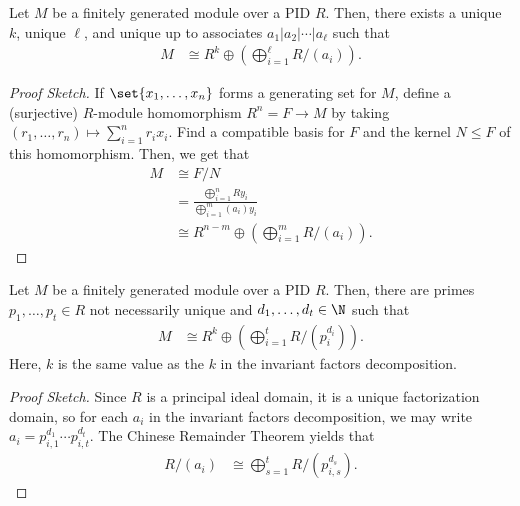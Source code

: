 \documentclass[10pt]{mypackage}
\begin{document}
\begin{theorem}
  Let $M$ be a finitely generated module over a PID $R$. Then, there exists a unique $k$, unique $\ell$, and unique up to associates $a_1 | a_2 | \cdots | a_{\ell}$ such that
  \begin{align*}
    M &\cong R^{k}\oplus \left( \bigoplus_{i=1}^{\ell} R/\left( a_i \right) \right).
  \end{align*}
\end{theorem}
\begin{proof}[Proof Sketch]
  If $\set{x_1,\dots,x_n}$ forms a generating set for $M$, define a (surjective) $R$-module homomorphism $R^{n} = F\rightarrow M$ by taking $\left( r_1,\dots,r_n \right)\mapsto \sum_{i=1}^{n}r_ix_i$. Find a compatible basis for $F$ and the kernel $N\leq F$ of this homomorphism. Then, we get that
  \begin{align*}
    M &\cong F/N\\
      &= \frac{\bigoplus_{i=1}^{n}Ry_i}{\bigoplus_{i=1}^{m}\left( a_i \right)y_i}\\
      &\cong R^{n-m} \oplus \left( \bigoplus_{i=1}^{m}R/\left( a_i \right) \right).
  \end{align*}
\end{proof}
\begin{theorem}
  Let $M$ be a finitely generated module over a PID $R$. Then, there are primes $p_1,\dots,p_t\in R$ not necessarily unique and $d_1,\dots,d_t\in \N$ such that
  \begin{align*}
    M &\cong R^{k}\oplus \left( \bigoplus_{i=1}^{t}R/\left( p_i^{d_i} \right) \right).
  \end{align*}
  Here, $k$ is the same value as the $k$ in the invariant factors decomposition.
\end{theorem}
\begin{proof}[Proof Sketch]
  Since $R$ is a principal ideal domain, it is a unique factorization domain, so for each $a_i$ in the invariant factors decomposition, we may write $a_i = p_{i,1}^{d_1}\cdots p_{i,t}^{d_t}$. The Chinese Remainder Theorem yields that
  \begin{align*}
    R/\left( a_i \right) &\cong \bigoplus_{s=1}^{t} R/\left( p_{i,s}^{d_{s}} \right).
  \end{align*}
\end{proof}
\end{document}
